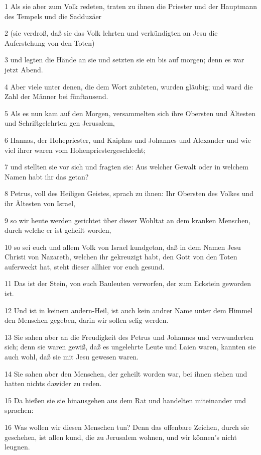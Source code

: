 \par 1 Als sie aber zum Volk redeten, traten zu ihnen die Priester und der Hauptmann des Tempels und die Sadduzäer
\par 2 (sie verdroß, daß sie das Volk lehrten und verkündigten an Jesu die Auferstehung von den Toten)
\par 3 und legten die Hände an sie und setzten sie ein bis auf morgen; denn es war jetzt Abend.
\par 4 Aber viele unter denen, die dem Wort zuhörten, wurden gläubig; und ward die Zahl der Männer bei fünftausend.
\par 5 Als es nun kam auf den Morgen, versammelten sich ihre Obersten und Ältesten und Schriftgelehrten gen Jerusalem,
\par 6 Hannas, der Hohepriester, und Kaiphas und Johannes und Alexander und wie viel ihrer waren vom Hohenpriestergeschlecht;
\par 7 und stellten sie vor sich und fragten sie: Aus welcher Gewalt oder in welchem Namen habt ihr das getan?
\par 8 Petrus, voll des Heiligen Geistes, sprach zu ihnen: Ihr Obersten des Volkes und ihr Ältesten von Israel,
\par 9 so wir heute werden gerichtet über dieser Wohltat an dem kranken Menschen, durch welche er ist geheilt worden,
\par 10 so sei euch und allem Volk von Israel kundgetan, daß in dem Namen Jesu Christi von Nazareth, welchen ihr gekreuzigt habt, den Gott von den Toten auferweckt hat, steht dieser allhier vor euch gesund.
\par 11 Das ist der Stein, von euch Bauleuten verworfen, der zum Eckstein geworden ist.
\par 12 Und ist in keinem andern-Heil, ist auch kein andrer Name unter dem Himmel den Menschen gegeben, darin wir sollen selig werden.
\par 13 Sie sahen aber an die Freudigkeit des Petrus und Johannes und verwunderten sich; denn sie waren gewiß, daß es ungelehrte Leute und Laien waren, kannten sie auch wohl, daß sie mit Jesu gewesen waren.
\par 14 Sie sahen aber den Menschen, der geheilt worden war, bei ihnen stehen und hatten nichts dawider zu reden.
\par 15 Da hießen sie sie hinausgehen aus dem Rat und handelten miteinander und sprachen:
\par 16 Was wollen wir diesen Menschen tun? Denn das offenbare Zeichen, durch sie geschehen, ist allen kund, die zu Jerusalem wohnen, und wir können's nicht leugnen.

